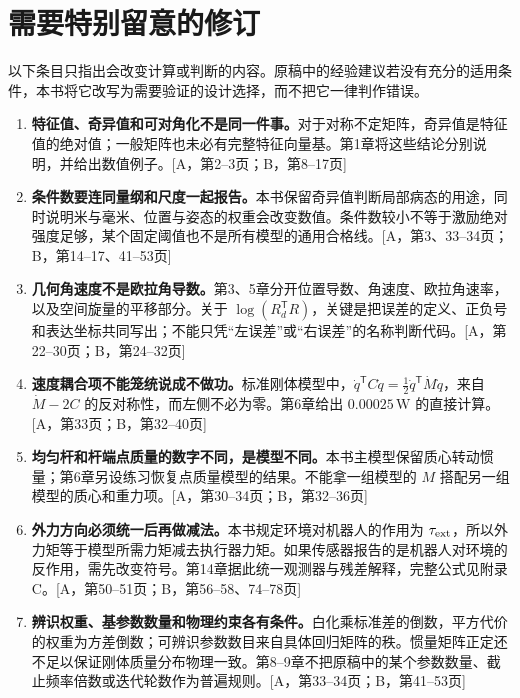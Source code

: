 \section{需要特别留意的修订}

以下条目只指出会改变计算或判断的内容。原稿中的经验建议若没有充分的适用条件，本书将它改写为需要验证的设计选择，而不把它一律判作错误。

\begin{enumerate}
\item \textbf{特征值、奇异值和可对角化不是同一件事。}对于对称不定矩阵，奇异值是特征值的绝对值；一般矩阵也未必有完整特征向量基。第1章将这些结论分别说明，并给出数值例子。[A，第2--3页；B，第8--17页]

\item \textbf{条件数要连同量纲和尺度一起报告。}本书保留奇异值判断局部病态的用途，同时说明米与毫米、位置与姿态的权重会改变数值。条件数较小不等于激励绝对强度足够，某个固定阈值也不是所有模型的通用合格线。[A，第3、33--34页；B，第14--17、41--53页]

\item \textbf{几何角速度不是欧拉角导数。}第3、5章分开位置导数、角速度、欧拉角速率，以及空间旋量的平移部分。关于 $\log(R_d^{\mathsf T}R)$，关键是把误差的定义、正负号和表达坐标共同写出；不能只凭“左误差”或“右误差”的名称判断代码。[A，第22--30页；B，第24--32页]

\item \textbf{速度耦合项不能笼统说成不做功。}标准刚体模型中，$\dot q^{\mathsf T}C\dot q=\tfrac12\dot q^{\mathsf T}\dot M\dot q$，来自 $\dot M-2C$ 的反对称性，而左侧不必为零。第6章给出 $0.00025\,\mathrm W$ 的直接计算。[A，第33页；B，第32--40页]

\item \textbf{均匀杆和杆端点质量的数字不同，是模型不同。}本书主模型保留质心转动惯量；第6章另设练习恢复点质量模型的结果。不能拿一组模型的 $M$ 搭配另一组模型的质心和重力项。[A，第30--34页；B，第32--36页]

\item \textbf{外力方向必须统一后再做减法。}本书规定环境对机器人的作用为 $\tau_{\rm ext}$，所以外力矩等于模型所需力矩减去执行器力矩。如果传感器报告的是机器人对环境的反作用，需先改变符号。第14章据此统一观测器与残差解释，完整公式见附录C。[A，第50--51页；B，第56--58、74--78页]

\item \textbf{辨识权重、基参数数量和物理约束各有条件。}白化乘标准差的倒数，平方代价的权重为方差倒数；可辨识参数数目来自具体回归矩阵的秩。惯量矩阵正定还不足以保证刚体质量分布物理一致。第8--9章不把原稿中的某个参数数量、截止频率倍数或迭代轮数作为普遍规则。[A，第33--34页；B，第41--53页]


\end{enumerate}
